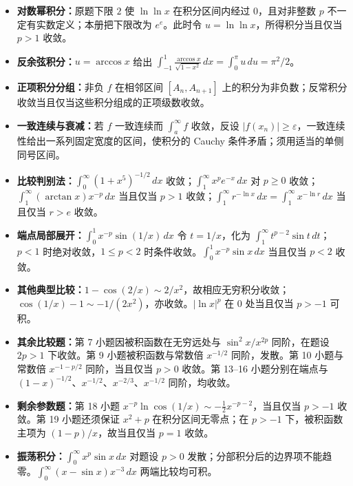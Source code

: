 \begin{itemize}
\item \textbf{对数幂积分：}原题下限 $2$ 使 $\ln\ln x$ 在积分区间内经过 $0$，且对非整数 $p$ 不一定有实数定义；本册把下限改为 $e^e$。此时令 $u=\ln\ln x$，所得积分当且仅当 $p>1$ 收敛。
\item \textbf{反余弦积分：}$u=\arccos x$ 给出 $\int_{-1}^1\frac{\arccos x}{\sqrt{1-x^2}}\,dx=\int_0^\pi u\,du=\pi^2/2$。
\item \textbf{正项积分分组：}非负 $f$ 在相邻区间 $[A_n,A_{n+1}]$ 上的积分为非负数；反常积分收敛当且仅当这些积分组成的正项级数收敛。
\item \textbf{一致连续与衰减：}若 $f$ 一致连续而 $\int_a^\infty f$ 收敛，反设 $|f(x_n)|\ge\varepsilon$，一致连续性给出一系列固定宽度的区间，使积分的 Cauchy 条件矛盾；须用适当的单侧同号区间。
\end{itemize}

\begin{itemize}
\item \textbf{比较判别法：}$\int_0^\infty(1+x^5)^{-1/2}\,dx$ 收敛；$\int_1^\infty x^pe^{-x}\,dx$ 对 $p\ge0$ 收敛；$\int_1^\infty(\arctan x)x^{-p}\,dx$ 当且仅当 $p>1$ 收敛；$\int_1^\infty r^{-\ln x}\,dx=\int_1^\infty x^{-\ln r}\,dx$ 当且仅当 $r>e$ 收敛。
\item \textbf{端点局部展开：}$\int_0^1x^{-p}\sin(1/x)\,dx$ 令 $t=1/x$，化为 $\int_1^\infty t^{p-2}\sin t\,dt$；$p<1$ 时绝对收敛，$1\le p<2$ 时条件收敛。$\int_0^1x^{-p}\sin x\,dx$ 当且仅当 $p<2$ 收敛。
\item \textbf{其他典型比较：}$1-\cos(2/x)\sim2/x^2$，故相应无穷积分收敛；$\cos(1/x)-1\sim-1/(2x^2)$，亦收敛。$|\ln x|^p$ 在 $0$ 处当且仅当 $p>-1$ 可积。
\item \textbf{其余比较题：}第 7 小题因被积函数在无穷远处与 $\sin^2x/x^{2p}$ 同阶，在题设 $2p>1$ 下收敛。第 9 小题被积函数与常数倍 $x^{-1/2}$ 同阶，发散。第 10 小题与常数倍 $x^{-1-p/2}$ 同阶，当且仅当 $p>0$ 收敛。第 13--16 小题分别在端点与 $(1-x)^{-1/2}$、$x^{-1/2}$、$x^{-2/3}$、$x^{-1/2}$ 同阶，均收敛。
\item \textbf{剩余参数题：}第 18 小题 $x^{-p}\ln\cos(1/x)\sim-\tfrac12x^{-p-2}$，当且仅当 $p>-1$ 收敛。第 19 小题还须保证 $x^2+p$ 在积分区间无零点；在 $p>-1$ 下，被积函数主项为 $(1-p)/x$，故当且仅当 $p=1$ 收敛。
\item \textbf{振荡积分：}$\int_0^\infty x^p\sin x\,dx$ 对题设 $p>0$ 发散；分部积分后的边界项不能趋零。$\int_0^\infty(x-\sin x)x^{-3}\,dx$ 两端比较均可积。
\end{itemize}

